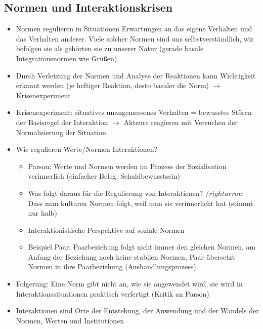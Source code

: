 \documentclass{scrartcl}
\begin{document}
\subsection*{Normen und Interaktionskrisen}
\begin{itemize}
    \item
        Normen regulieren in Situationen Erwartungen an das eigene Verhalten und das Verhalten anderer. Viele solcher Normen sind uns selbstverständlich, wir befolgen sie als gehörten sie zu unserer Natur (gerade basale Integrationsnormen wie Grüßen)
    \item
        Durch Verletzung der Normen und Analyse der Reaktionen kann Wichtigkeit erkannt werden (je heftiger Reaktion, desto basaler die Norm) $\rightarrow$ Krisenexperiment
    \item
        Krisenexperiment: situatives unangemessenes Verhalten = bewusstes Stören der Basisregel der Interaktion $\rightarrow$ Akteure reagieren mit Versuchen der Normalisierung der Situation
    \item
        Wie regulieren Werte/Normen Interaktionen?
        \begin{itemize}
            \item
                Parson: Werte und Normen werden im Prozess der Sozialisation verinnerlich (einfacher Beleg: Schuldbewusstsein)
            \item
                Was folgt daraus für die Regulierung von Interaktionen? $/rightarrow$ Dass man kulturen Normen folgt, weil man sie verinnerlicht hat (stimmt nur halb)
            \item
                Interaktionistische Perspektive auf soziale Normen
            \item
                Beispiel Paar: Paarbeziehung folgt nicht immer den gleichen Normen, am Anfang der Beziehung noch keine stabilen Normen, Paar übersetzt Normen in ihre Paarbeziehung (Aushandlungsprozess)
        \end{itemize}
    \item
        Folgerung: Eine Norm gibt nicht an, wie sie angewendet wird, sie wird in Interaktionssituationen praktisch verfertigt (Kritik an Parson)
    \item
        Interaktionen sind Orte der Entstehung, der Anwendung und der Wandels der Normen, Werten und Institutionen
\end{itemize}
\end{document}
